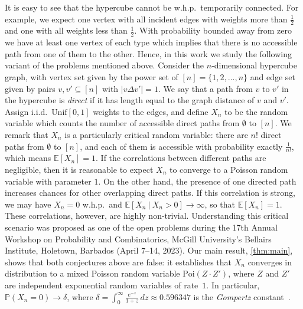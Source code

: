 \documentclass[11pt]{article}
\theoremstyle{definition}
\theoremstyle{remark}
\theoremstyle{remark}
\numberwithin{theorem}{section}
\newcommand{\E}{\mathbb{E}}
\begin{document}
It is easy to see that the hypercube cannot be w.h.p.\ temporarily connected. For example, we expect one vertex with all incident edges with weights more than $\tfrac12$ and one with all weights less than $\tfrac12$. With probability bounded away from zero we have at least one vertex of each type which implies that there is no accessible path from one of them to the other. Hence, in this work we study the following variant of the problems mentioned above. Consider the $n$-dimensional hypercube graph, with vertex set given by the power set of $[n] = \{1,2,\dots,n\}$ and edge set given by pairs $v,v' \subseteq [n]$ with $|v \Delta v'| = 1$. We say that a path from $v$ to $v'$ in the hypercube is \textit{direct} if it has length equal to the graph distance of $v$ and $v'$. Assign i.i.d.\ $\text{Unif}[0,1]$ weights to the edges, and define $X_{n}$ to be the random variable which counts the number of accessible direct paths from $\emptyset$ to $[n]$. We remark that $X_{n}$ is a particularly critical random variable: there are $n!$ direct paths from $\emptyset$ to $[n]$, and each of them is accessible with probability exactly $\frac{1}{n!}$, which means $\E[X_n]=1$. If the correlations between different paths are negligible, then it is reasonable to expect $X_n$ to converge to a Poisson random variable with parameter $1$. On the other hand, the presence of one directed path increases chances for other overlapping direct paths. If this correlation is strong, we may have $X_n=0$ w.h.p.\ and $\E[X_n\ |\ X_n>0]\to\infty$, so that $\E[X_n]=1$. These correlations, however, are highly non-trivial. Understanding this critical scenario was proposed as one of the open problems during the 17th Annual Workshop on Probability and Combinatorics, McGill University’s Bellairs Institute, Holetown, Barbados (April 7--14, 2023). Our main result, \cref{thm:main}, shows that both conjectures above are false: it establishes that $X_{n}$ converges in distribution to a mixed Poisson random variable $\text{Poi}(Z\cdot Z')$, where $Z$ and $Z'$ are independent exponential random variables of rate~$1$. In particular, $\mathbb{P}(X_n=0) \to \delta$, where $\delta=\int_{0}^{\infty}\frac{e^{-z}}{1+z}\,dz \approx 0.596347$ is the \emph{Gompertz} constant~\citep{gompertz1825mortality}.
\end{document}
